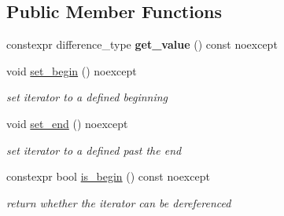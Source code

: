 \subsection*{Public Member Functions}
\begin{DoxyCompactItemize}
\item 
\mbox{\label{classnlohmann_1_1detail_1_1primitive__iterator__t_ae952990886ca1756229f916661a8af81}} 
constexpr difference\+\_\+type {\bfseries get\+\_\+value} () const noexcept
\item 
\mbox{\label{classnlohmann_1_1detail_1_1primitive__iterator__t_a9d9b005906106e12aed738f97d7fee42}} 
void \hyperlink{classnlohmann_1_1detail_1_1primitive__iterator__t_a9d9b005906106e12aed738f97d7fee42}{set\+\_\+begin} () noexcept
\begin{DoxyCompactList}\small\item\em set iterator to a defined beginning \end{DoxyCompactList}\item 
\mbox{\label{classnlohmann_1_1detail_1_1primitive__iterator__t_ad26a823483846a12d890c3feed3097eb}} 
void \hyperlink{classnlohmann_1_1detail_1_1primitive__iterator__t_ad26a823483846a12d890c3feed3097eb}{set\+\_\+end} () noexcept
\begin{DoxyCompactList}\small\item\em set iterator to a defined past the end \end{DoxyCompactList}\item 
\mbox{\label{classnlohmann_1_1detail_1_1primitive__iterator__t_a8d1a7d46b3fcd06edd034f04ededb5e4}} 
constexpr bool \hyperlink{classnlohmann_1_1detail_1_1primitive__iterator__t_a8d1a7d46b3fcd06edd034f04ededb5e4}{is\+\_\+begin} () const noexcept
\begin{DoxyCompactList}\small\item\em return whether the iterator can be dereferenced \end{DoxyCompactList}\item 
\mbox{\label{classnlohmann_1_1detail_1_1primitive__iterator__t_a45a7e301c23b5b90417baf2277f40b1d}} 

\end{DoxyCompactItemize}
